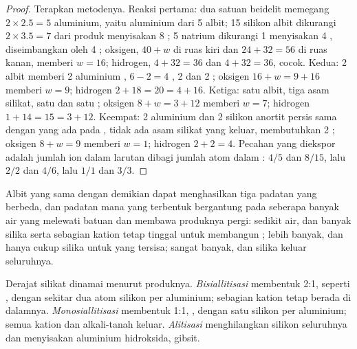 \begin{proof}
Terapkan metodenya. Reaksi pertama: dua satuan beidelit memegang $2\times2.5 = 5$ aluminium, yaitu aluminium dari 5 albit; 15 silikon albit dikurangi $2\times3.5 = 7$ dari produk menyisakan 8 ; 5 natrium dikurangi 1 menyisakan 4 , diseimbangkan oleh 4 ; oksigen, $40 + w$ di ruas kiri dan $24 + 32 =
56$ di ruas kanan, memberi $w = 16$; hidrogen, $4 + 32 = 36$ dan $4 + 32 = 36$, cocok. Kedua: 2 albit memberi 2 aluminium , $6 - 2 = 4$ , 2  dan 2 ; oksigen $16 + w = 9 + 16$ memberi $w = 9$; hidrogen $2 + 18 = 20 = 4 + 16$. Ketiga: satu albit, tiga asam silikat, satu  dan satu ; oksigen $8 + w = 3 + 12$ memberi $w = 7$; hidrogen $1 + 14 = 15 = 3 + 12$. Keempat: 2 aluminium dan 2 silikon anortit persis sama dengan yang ada pada , tidak ada asam silikat yang keluar,  membutuhkan 2 ; oksigen $8 + w = 9$ memberi $w = 1$; hidrogen $2 + 2 = 4$. Pecahan yang diekspor adalah jumlah ion dalam larutan dibagi jumlah atom dalam : $4/5$ dan $8/15$, lalu $2/2$ dan $4/6$, lalu $1/1$ dan $3/3$.
\end{proof}

Albit yang sama dengan demikian dapat menghasilkan tiga padatan yang berbeda, dan padatan mana yang terbentuk bergantung pada seberapa banyak air yang melewati batuan dan membawa produknya pergi: sedikit air, dan banyak silika serta sebagian kation tetap tinggal untuk membangun ; lebih banyak, dan hanya cukup silika untuk  yang tersisa; sangat banyak, dan silika keluar seluruhnya.

\begin{definition}\label{def:b1:weathering-clays:hydrolysis-degree}
Derajat  silikat dinamai menurut produknya. \emph{Bisiallitisasi} membentuk  2:1, seperti , dengan sekitar dua atom silikon per aluminium; sebagian kation tetap berada di dalamnya. \emph{Monosiallitisasi} membentuk  1:1, , dengan satu silikon per aluminium; semua kation  dan alkali-tanah keluar. \emph{Alitisasi} menghilangkan silikon seluruhnya dan menyisakan aluminium hidroksida, gibsit.
\end{definition}

